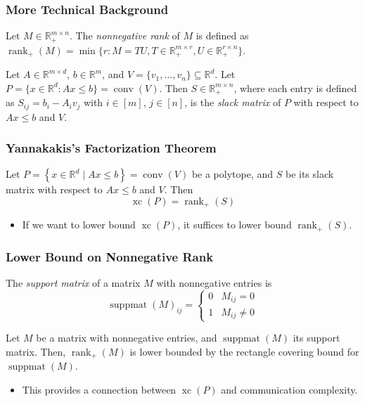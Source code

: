 \documentclass{beamer}
\newcommand{\nrank}{\operatorname{rank}_+}
\newcommand{\conv}{\operatorname{conv}}
\newcommand{\suppmat}{\operatorname{suppmat}}
\newcommand{\xc}{\operatorname{xc}}
\renewcommand{\R}{\mathbb{R}}
\begin{document}
\begin{frame}
\frametitle{More Technical Background}

\pause
\begin{definition}
Let $M \in \R_+^{m \times n}$. The \emph{nonnegative rank} of $M$ is defined as $\nrank(M) = \min\{r : M = TU, T \in \R_+^{m \times r}, U \in \R_+^{r \times n}\}$.
\end{definition}

\pause
\begin{definition}
Let $A \in \R^{m \times d}$, $b \in \R^m$, and $V = \{v_1, \ldots, v_n\} \subseteq \R^d$. Let $P = \{x \in \R^d : Ax \le b\} = \conv(V)$. Then $S \in \R_+^{m\times n}$, where each entry is defined as $S_{ij} = b_i - A_i v_j$ with $i \in [m]$, $j \in [n]$, is the \emph{slack matrix} of $P$ with respect to $Ax \le b$ and $V$.
\end{definition}

\end{frame}


\begin{frame}
\frametitle{Yannakakis's Factorization Theorem}

\pause
\begin{theorem}
Let $P = \left\{ x \in \R^d \mid Ax \leq b \right\} = \conv(V)$ be a polytope, and $S$ be its slack matrix with respect to $Ax \leq b$ and $V$. Then
\[
\xc(P) = \nrank(S)
\]
\end{theorem}

\pause
\begin{itemize}
\item If we want to lower bound $\xc(P)$, it suffices to lower bound $\nrank(S)$.
\end{itemize}

\end{frame}


\begin{frame}
\frametitle{Lower Bound on Nonnegative Rank}

\pause
\begin{definition}
The {\em support matrix} of a matrix $M$ with nonnegative entries is
\[
\suppmat(M)_{ij} = \begin{cases}
0 & M_{ij} = 0 \\
1 & M_{ij} \neq 0
\end{cases}
\]
\end{definition}

\pause
\begin{theorem}
Let $M$ be a matrix with nonnegative entries, and $\suppmat(M)$ its support matrix.
Then, $\nrank(M)$ is lower bounded by the rectangle covering bound for $\suppmat(M)$.
\end{theorem}

\pause
\begin{itemize}
\item This provides a connection between $\xc(P)$ and communication complexity.
\end{itemize}

\end{frame}
\end{document}
